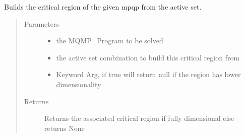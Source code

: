 \documentclass[letterpaper,10pt,english]{sphinxmanual}
\begin{document}
\begin{fulllineitems}
\label{\detokenize{mpo.utils:mpo.utils.mpqp_utils.gen_cr_from_active_set}}
\sphinxAtStartPar
Builds the critical region of the given mpqp from the active set.
\begin{quote}\begin{description}
\item[{Parameters}] \leavevmode\begin{itemize}
\item {} 
\sphinxAtStartPar
{} \textendash{} the MQMP\_Program to be solved

\item {} 
\sphinxAtStartPar
{} \textendash{} the active set combination to build this critical region from

\item {} 
\sphinxAtStartPar
{} \textendash{} Keyword Arg, if true will return null if the region has lower dimensionality

\end{itemize}

\item[{Returns}] \leavevmode
\sphinxAtStartPar
Returns the associated critical region if fully dimensional else returns None

\end{description}\end{quote}

\end{fulllineitems}

\end{document}
